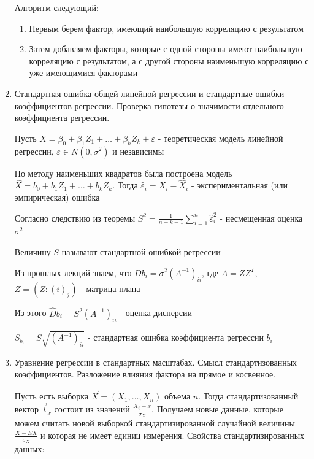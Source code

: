 \begin{enumerate}
    \smallvspace

    Алгоритм следующий: 

    \begin{enumerate}
        \item Первым берем фактор, имеющий наибольшую корреляцию с результатом
        \item Затем добавляем факторы, которые с одной стороны имеют наибольшую корреляцию с результатом, а с другой стороны наименьшую корреляцию с уже имеющимися факторами
    \end{enumerate}

    \item Стандартная ошибка общей линейной регрессии и стандартные ошибки коэффициентов регрессии. Проверка гипотезы о значимости отдельного коэффициента регрессии.

    Пусть $X = \beta_0 + \beta_1 Z_1 + \dots + \beta_k Z_k + \varepsilon$ - теоретическая модель линейной регрессии, $\varepsilon \in N(0, \sigma^2)$ и независимы

    По методу наименьших квадратов была построена модель $\hat X = b_0 + b_1 Z_1 + \dots + b_k Z_k$. Тогда $\hat \varepsilon_i = X_i - \hat X_i$ - экспериментальная (или эмпирическая) ошибка

    Согласно следствию из теоремы $S^2 = \frac{1}{n - k - 1} \sum_{i = 1}^n \hat \varepsilon_i^2$ - несмещенная оценка $\sigma^2$

    \Def Величину $S$ называют стандартной ошибкой регрессии 

    Из прошлых лекций знаем, что $D b_i = \sigma^2 (A^{-1})_{ii}$, где $A = Z Z^T$, $Z = (Z:{(i)}_j)$ - матрица плана

    Из этого $\hat D b_i = S^2 (A^{-1})_{ii}$ - оценка дисперсии

    \Def $S_{b_i} = S \sqrt{(A^{-1})_{ii}}$ - стандартная ошибка коэффициента регрессии $b_i$

    \item Уравнение регрессии в стандартных масштабах. Смысл стандартизованных коэффициентов. Разложение влияния фактора на прямое и косвенное.

    Пусть есть выборка $\vec X = (X_1, \dots, X_n)$ объема $n$. Тогда стандартизованный вектор $\vec t_x$ состоит из значений $\frac{X_i - \overline{x}}{\hat \sigma_X}$. Получаем новые данные, которые можем считать новой выборкой стандартизированной случайной величины $\frac{X - EX}{\sigma_X}$ и которая не имеет единиц измерения. Свойства стандартизированных данных:


\end{enumerate}
